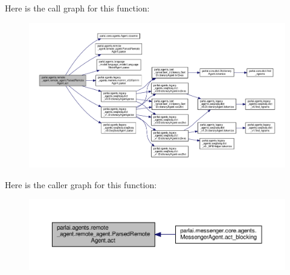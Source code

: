 Here is the call graph for this function\+:
\nopagebreak
\begin{figure}[H]
\begin{center}
\leavevmode
\includegraphics[width=350pt]{classparlai_1_1agents_1_1remote__agent_1_1remote__agent_1_1ParsedRemoteAgent_a7eb6a8cdcffb425506e085c4bef07a85_cgraph}
\end{center}
\end{figure}
Here is the caller graph for this function\+:
\nopagebreak
\begin{figure}[H]
\begin{center}
\leavevmode
\includegraphics[width=350pt]{classparlai_1_1agents_1_1remote__agent_1_1remote__agent_1_1ParsedRemoteAgent_a7eb6a8cdcffb425506e085c4bef07a85_icgraph}
\end{center}
\end{figure}
\mbox{\label{classparlai_1_1agents_1_1remote__agent_1_1remote__agent_1_1ParsedRemoteAgent_ae364a1860ec6ff9f32dabc42b96004d0}} 
